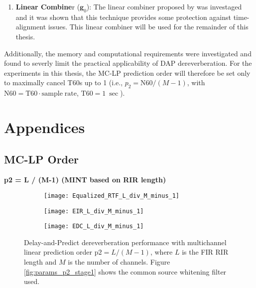 \begin{enumerate}
	\item \textbf{Linear Combine}r ($\boldsymbol{g}_0$): The linear combiner proposed by \cite{triki2006delay} was investaged and it was shown that this technique provides some protection against time-alignment issues. This linear combiner will be used for the remainder of this thesis.
\end{enumerate}

Additionally, the memory and computational requirements were investigated and found to severly limit the practical applicability of DAP dereverberation. For the experiments in this thesis, the MC-LP prediction order will therefore be set only to maximally cancel T60s up to \qty{1}{\sec} (i.e., $p_2=\mathrm{N60}/\left(M-1\right)$,  with $\mathrm{N60} = \mathrm{T60} \cdot \mathrm{sample \; rate}$, $\mathrm{T60} = \qty{1}{\sec}$).


\section{Appendices}

\subsection{MC-LP Order} \label{section:appendix:params_p2}

\textbf{p2 = L / (M-1)  (MINT based on RIR length)}

\begin{figure}[H]
	\centering
	\begin{subfigure}[b]{0.32\textwidth}
		\centering
		\texttt{[image: Equalized\_RTF\_L\_div\_M\_minus\_1]}
		 \label{subfig:test_subfig_1}
	\end{subfigure}
	\hfill
	\begin{subfigure}[b]{0.32\textwidth}
		\centering
		\texttt{[image: EIR\_L\_div\_M\_minus\_1]}
	\end{subfigure}
	\hfill
	\begin{subfigure}[b]{0.32\textwidth}
		\centering
		\texttt{[image: EDC\_L\_div\_M\_minus\_1]}
	\end{subfigure}
	\hfill
	\caption{Delay-and-Predict dereverberation performance with multichannel linear prediction order $\mathrm{p2} = L / (M-1)$, where $L$ is the FIR RIR length and $M$ is the number of channels. Figure \ref{fig:params_p2_stage1} shows the common source whitening filter used.}
	\label{fig:params_p2_L}
\end{figure}

